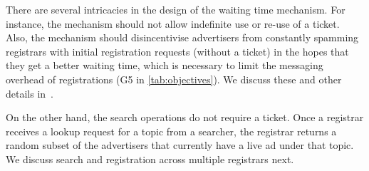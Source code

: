 There are several intricacies in the design of the waiting time mechanism. For instance, the mechanism should not allow indefinite use or re-use of a ticket. Also, the mechanism should disincentivise advertisers from constantly spamming registrars with initial registration requests (without a ticket) in the hopes that they get a better waiting time, which is necessary to limit the messaging overhead of registrations (G5 in \cref{tab:objectives}). We discuss these and other details in~. 

On the other hand, the search operations do not require a ticket. Once a registrar receives a lookup request for a topic from a searcher, the registrar returns a random subset of the advertisers that currently have a live ad under that topic. We discuss search and registration across multiple registrars next.



